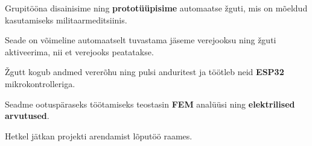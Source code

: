 \documentclass[letterpaper]{deedy-resume} %
\begin{document}
\begin{minipage}[t]{0.66\textwidth}
\sectionspace %


\begin{tightitemize}
\item Grupitööna disainisime ning \textbf{prototüüpisime} automaatse žguti, mis on mõeldud kasutamiseks militaarmeditsiinis.
\item Seade on võimeline automaatselt tuvastama jäseme verejooksu ning žguti aktiveerima, nii et verejooks peatatakse.
\item Žgutt kogub andmed vererõhu ning pulsi anduritest ja töötleb neid \textbf{ESP32} mikrokontrolleriga.
\item Seadme ootuspäraseks töötamiseks teostasin \textbf{FEM} analüüsi ning \textbf{elektrilised arvutused}.
\item Hetkel jätkan projekti arendamist lõputöö raames.
\end{tightitemize}

\sectionspace %

\end{minipage} %

\end{document}
